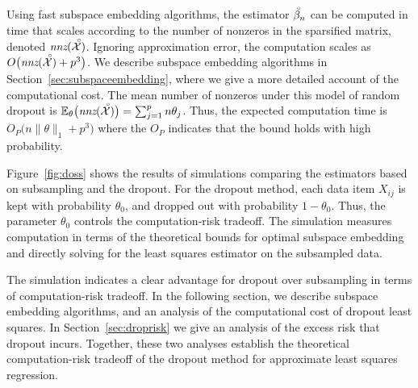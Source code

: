 Using fast subspace embedding algorithms, the estimator
$\accentset{\;\circ}{\beta}_n$ can be computed in time
that scales according to the number of nonzeros in the sparsified
matrix, denoted $\textit{nnz}(\accentset{\;\circ}{\mathcal{X}})$.   Ignoring approximation error, the computation scales as
$O\bigl(\textit{nnz}(\accentset{\;\circ}{\mathcal{X}}) +p^3\bigr)$.
We describe subspace embedding algorithms in
Section~\ref{sec:subspaceembedding},
where we give a more detailed account of the computational cost.
The mean number of nonzeros under this model of random dropout is ${\mathbb E}_\theta\bigl( \text{\it nnz}(\accentset{\;\circ}{\mathcal{X}})\bigr) =
\sum_{j=1}^p n\theta_j$.  Thus, the expected 
computation time is $O_P\bigl( n\|\theta\|_1 + p^3\bigr)$
where the $O_P$ indicates that the bound holds with high probability.


Figure~\ref{fig:doss} shows the results of simulations comparing the
estimators based on subsampling and the dropout.  For the dropout
method, each data item $X_{ij}$ is kept with probability $\theta_0$,
and dropped out with probability $1-\theta_0$.  Thus, the parameter
$\theta_0$ controls the computation-risk tradeoff.  The simulation measures
computation in terms of the theoretical bounds
for optimal subspace embedding and directly solving for the least squares
estimator on the subsampled data.  

The simulation indicates a clear
advantage for dropout over subsampling in terms of computation-risk
tradeoff.  In the following section, we describe subspace embedding
algorithms, and an analysis of the computational cost of
dropout least squares.    In Section~\ref{sec:droprisk}
we give an analysis of the excess risk that dropout incurs. Together,
these two analyses establish the theoretical computation-risk tradeoff
of the dropout method for approximate least squares regression.


